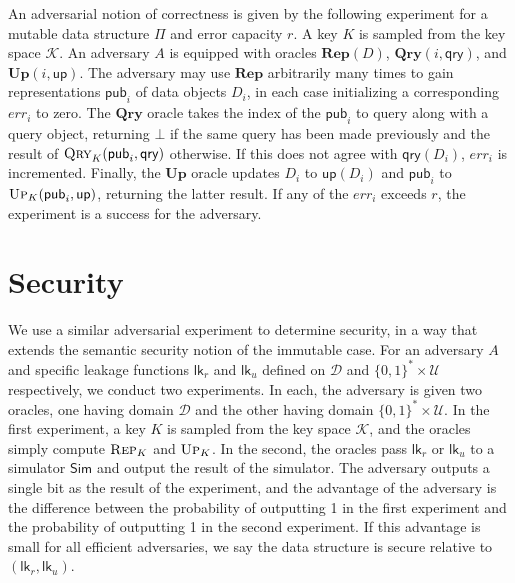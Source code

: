 \documentclass[11pt, pdftex]{article}
\begin{document}
An adversarial notion of correctness is given by the following experiment for a mutable data structure $\Pi$ and error capacity $r$. A key $K$ is sampled from the key space $\mathcal{K}$. An adversary $A$ is equipped with oracles $\mathbf{Rep}(D)$, $\mathbf{Qry}(i,\mathsf{qry})$, and $\mathbf{Up}(i,\mathsf{up})$. The adversary may use $\mathbf{Rep}$ arbitrarily many times to gain representations $\mathsf{pub}_i$ of data objects $D_i$, in each case initializing a corresponding $err_i$ to zero. The $\mathbf{Qry}$ oracle takes the index of the $\mathsf{pub}_i$ to query along with a query object, returning $\bot$ if the same query has been made previously and the result of $\textsc{Qry}_K(\mathsf{pub}_i,\mathsf{qry})$ otherwise. If this does not agree with $\mathsf{qry}(D_i)$, $err_i$ is incremented. Finally, the $\mathbf{Up}$ oracle updates $D_i$ to $\mathsf{up}(D_i)$ and $\mathsf{pub}_i$ to $\textsc{Up}_K(\mathsf{pub}_i,\mathsf{up})$, returning the latter result. If any of the $err_i$ exceeds $r$, the experiment is a success for the adversary.

\section{Security}

We use a similar adversarial experiment to determine security, in a way that extends the semantic security notion of the immutable case. For an adversary $A$ and specific leakage functions $\mathsf{lk}_r$ and $\mathsf{lk}_u$ defined on $\mathcal{D}$ and $\{0,1\}^* \times \mathcal{U}$ respectively, we conduct two experiments. In each, the adversary is given two oracles, one having domain $\mathcal{D}$ and the other having domain $\{0,1\}^* \times \mathcal{U}$. In the first experiment, a key $K$ is sampled from the key space $\mathcal{K}$, and the oracles simply compute $\textsc{Rep}_K$ and $\textsc{Up}_K$. In the second, the oracles pass $\mathsf{lk}_r$ or $\mathsf{lk}_u$ to a simulator $\mathsf{Sim}$ and output the result of the simulator. The adversary outputs a single bit as the result of the experiment, and the advantage of the adversary is the difference between the probability of outputting 1 in the first experiment and the probability of outputting 1 in the second experiment. If this advantage is small for all efficient adversaries, we say the data structure is secure relative to $(\mathsf{lk}_r,\mathsf{lk}_u)$.
\end{document}
